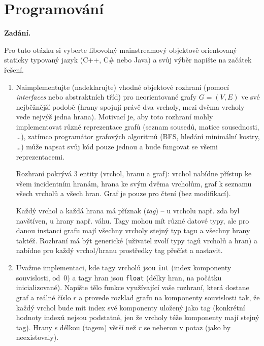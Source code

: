 \section{Programování}

\noindent\textbf{Zadání.}\par
Pro tuto otázku si vyberte libovolný mainstreamový objektově orientovaný staticky
typovaný jazyk (C++, C\# nebo Java) a svůj výběr napište na začátek řešení.

\begin{enumerate}
\item Naimplementujte (nadeklarujte) vhodné objektové rozhraní (pomocí \textit{interfaces}
  nebo abstraktních tříd) pro neorientované grafy $G = (V, E)$ ve své nejběžnější podobě
  (hrany spojují právě dva vrcholy, mezi dvěma vrcholy vede nejvýš jedna hrana). Motivací
  je, aby toto rozhraní mohly implementovat různé reprezentace grafů (seznam sousedů,
  matice sousednosti, \dots), zatímco programátor grafových algoritmů (BFS, hledání
  minimální kostry, \dots) může napsat svůj kód pouze jednou a bude fungovat se všemi
  reprezentacemi.

  Rozhraní pokrývá 3 entity (vrchol, hranu a graf): vrchol nabídne přístup ke všem
  incidentním hranám, hrana ke svým dvěma vrcholům, graf k seznamu všech vrcholů a všech
  hran. Graf je pouze pro čtení (bez modifikací).

  Každý vrchol a každá hrana má příznak (\textit{tag}) -- u vrcholu např. zda byl
  navštíven, u hrany např. váhu. Tagy mohou mít různé datové typy, ale pro danou instanci
  grafu mají všechny vrcholy stejný typ tagu a všechny hrany taktéž. Rozhraní má být
  generické (uživatel zvolí typy tagů vrcholů a hran) a nabídne pro každý vrchol/hranu
  prostředky tag přečíst a nastavit.

\item Uvažme implementaci, kde tagy vrcholů jsou \texttt{int} (index komponenty
  souvislosti, od~0) a tagy hran jsou \texttt{float} (délky hran, na počátku
  inicializované). Napište tělo funkce využívající vaše rozhraní, která dostane graf a
  reálné číslo $r$ a provede rozklad grafu na komponenty souvislosti tak, že každý vrchol
  bude mít index své komponenty uložený jako tag (konkrétní hodnoty indexů nejsou
  podstatné, jen že vrcholy téže komponenty mají stejný tag). Hrany s délkou (tagem) větší
  než $r$ se neberou v potaz (jako by neexistovaly).
\end{enumerate}

